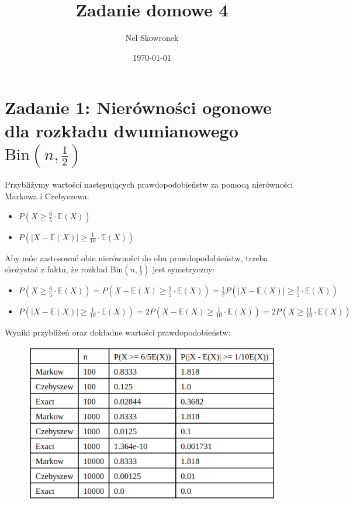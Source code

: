 \documentclass{article}
\title{Zadanie domowe 4}
\author{Nel Skowronek}
\date{\today}
\begin{document}
\maketitle

\section*{Zadanie 1: Nierówności ogonowe dla rozkładu dwumianowego \(\text{Bin}\left(n, \frac{1}{2}\right)\)}

Przybliżymy wartości następujących prawdopodobieństw za pomocą nierówności Markowa i Czebyszewa:
\begin{itemize}
    \item \( P\left(X \geq \frac{6}{5} \cdot \mathbb{E}(X)\right) \)
    \item \( P\left(\left|X - \mathbb{E}(X)\right| \geq \frac{1}{10} \cdot \mathbb{E}(X) \right) \)
\end{itemize}
Aby móc zastosować obie nierówności do obu prawdopodobieństw, trzeba skożystać z faktu, że rozkład \(\text{Bin}\left(n, \frac{1}{2}\right)\) jest symetryczny:
\begin{itemize}
    \item \( P\left(X \geq \frac{6}{5} \cdot \mathbb{E}(X)\right) = P\left(X - \mathbb{E}(X) \geq \frac{1}{5} \cdot \mathbb{E}(X)\right) = \frac{1}{2}P\left(\left|X - \mathbb{E}(X)\right| \geq \frac{1}{5} \cdot \mathbb{E}(X)\right) \)
    \item \( P\left(\left|X - \mathbb{E}(X) \right| \geq \frac{1}{10} \cdot \mathbb{E}(X) \right) = 2P\left(X - \mathbb{E}(X) \geq \frac{1}{10} \cdot \mathbb{E}(X) \right) = 2P\left(X \geq \frac{11}{10} \cdot \mathbb{E}(X) \right) \)
\end{itemize}

Wyniki przybliżeń oraz dokładne wartości prawdopodobieństw:\\
\begin{figure}[h!]
    \centering
    \includegraphics[scale=0.5]{./plots/exc1.png}
\end{figure}
\end{document}
